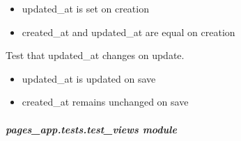 \documentclass[letterpaper,10pt,english]{sphinxmanual}
\begin{document}
\begin{fulllineitems}
\begin{fulllineitems}
\begin{description}
\begin{itemize}
\item {} 
\sphinxAtStartPar
updated\_at is set on creation

\item {} 
\sphinxAtStartPar
created\_at and updated\_at are equal on creation

\end{itemize}

\end{description}

\end{fulllineitems}


\begin{fulllineitems}
\label{\detokenize{pages_app.tests:pages_app.tests.test_models.TimestampedModelTest.test_updated_at_auto_updates}}
\pysigstartsignatures
\pysiglinewithargsret
{}
{}
{}
\pysigstopsignatures
\sphinxAtStartPar
Test that updated\_at changes on update.
\begin{description}
\begin{itemize}
\item {} 
\sphinxAtStartPar
updated\_at is updated on save

\item {} 
\sphinxAtStartPar
created\_at remains unchanged on save

\end{itemize}

\end{description}

\end{fulllineitems}


\end{fulllineitems}



\subparagraph{pages\_app.tests.test\_views module}
\label{\detokenize{pages_app.tests:module-pages_app.tests.test_views}}\label{\detokenize{pages_app.tests:pages-app-tests-test-views-module}}
\end{document}
